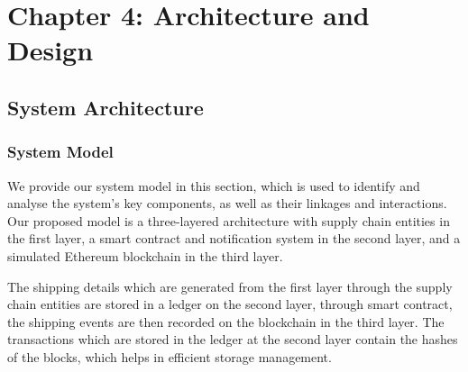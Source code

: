 \documentclass[12pt,a4paper,twocolumn,fleqn]{article}
\begin{document}
\newpage
  \pagestyle{fancy}
  \thispagestyle{empty}
  \thispagestyle{plain}
  \fancyhf{}
  \chead{}
  \renewcommand{\headrulewidth}{0.4pt}%
\renewcommand{\footrulewidth}{0.4pt}%
\section{Chapter 4: Architecture and Design} 
\subsection{System Architecture}
\subsubsection{System Model}
We provide our system model in this section, which is used to identify and analyse the system's key components, as well as their linkages and interactions. Our proposed model is a three-layered architecture with supply chain entities in the first layer, a smart contract and notification system in the second layer, and a simulated Ethereum blockchain in the third layer. 

The shipping details which are generated from the first layer through the supply chain entities are stored in a ledger on the second layer, through smart contract, the shipping events are then recorded on the blockchain in the third layer. The transactions which are stored in the ledger at the second layer contain the hashes of the blocks, which helps in efficient storage management. 
\end{document}
